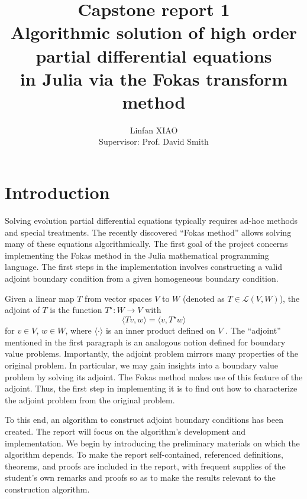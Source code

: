 \documentclass[11pt, oneside, a4paper]{article}
\author{Linfan XIAO\\
Supervisor: Prof. David Smith}
\title{Capstone report 1\\
Algorithmic solution of high order partial differential equations\\
in Julia via the Fokas transform method}
\date{\vspace{-5ex}}
\begin{document}
\maketitle

\thispagestyle{fancy}

\tableofcontents
\newpage
\section{Introduction}
Solving evolution partial differential equations typically requires ad-hoc methods and special treatments. The recently discovered ``Fokas method''\cite{Smith2016}\cite{Kesici2016} allows solving many of these equations algorithmically. The first goal of the project concerns implementing the Fokas method in the Julia mathematical programming language. The first steps in the implementation involves constructing a valid adjoint boundary condition from a given homogeneous boundary condition. 

Given a linear map $T$ from vector spaces $V$ to $W$ (denoted as $T\in\mathcal{L}(V,W)$), the adjoint of $T$ is the function $T^\star:W\to V$ with
\begin{equation}\label{eq:linear map adjoint}
    \langle Tv, w\rangle = \langle v, T^\star w\rangle
\end{equation}
for $v\in V$, $w\in W$, where $\langle \cdot \rangle$ is an inner product defined on $V$ \cite[p.204]{Axler1997}. The ``adjoint'' mentioned in the first paragraph is an analogous notion defined for boundary value problems. Importantly, the adjoint problem mirrors many properties of the original problem. In particular, we may gain insights into a boundary value problem by solving its adjoint. The Fokas method makes use of this feature of the adjoint. Thus, the first step in implementing it is to find out how to characterize the adjoint problem from the original problem. 

To this end, an algorithm to construct adjoint boundary conditions has been created. The report will focus on the algorithm's development and implementation. We begin by introducing the preliminary materials on which the algorithm depends. To make the report self-contained, referenced definitions, theorems, and proofs are included in the report, with frequent supplies of the student's own remarks and proofs so as to make the results relevant to the construction algorithm. 
\end{document}
